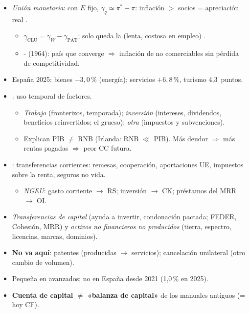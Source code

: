 \documentclass{article}
\begin{document}
\begin{columnas}
\begin{itemize}
\item \emph{Unión monetaria}: con $E$ fijo, $\gamma_q\simeq\pi^*-\pi$: inflación $>$ socios = apreciación real .
  \begin{itemize}
  \item $\gamma_{\mathrm{CLU}}=\gamma_W-\gamma_{\mathrm{PAT}}$; solo queda la  (lenta, costosa en empleo) .
  \item {}- (1964): país que converge $\Rightarrow$ inflación de no comerciables sin pérdida de competitividad.
  \end{itemize}
\item España 2025: bienes $-3{,}0$\,\% (energía); servicios $+6{,}8$\,\%, turismo 4,3~puntos.
\end{itemize}
\begin{itemize}
\item {}: uso temporal de factores.
  \begin{itemize}
  \item \emph{Trabajo} (fronterizos, temporada); \emph{inversión} (intereses, dividendos, beneficios reinvertidos; el grueso); \emph{otra} (impuestos y subvenciones).
  \item Explican PIB $\neq$ RNB (Irlanda: RNB $\ll$ PIB). Más deudor $\Rightarrow$ más rentas pagadas $\Rightarrow$ peor CC futura.
  \end{itemize}
\item {}: transferencias corrientes: remesas, cooperación, aportaciones UE, impuestos sobre la renta, seguros no vida.
  \begin{itemize}
  \item \emph{NGEU}: gasto corriente $\to$ RS; inversión $\to$ CK; préstamos del MRR $\to$ OI.
  \end{itemize}
\end{itemize}

\begin{itemize}
\item \emph{Transferencias de capital} (ayuda a invertir, condonación pactada; FEDER, Cohesión, MRR) y \emph{activos no financieros no producidos} (tierra, espectro, licencias, marcas, dominios).
\item \textbf{No va aquí}: patentes (producidas $\to$ servicios); cancelación unilateral (otro cambio de volumen).
\item Pequeña en avanzados; no en España desde 2021 (1,0\,\% en 2025).
\item \textbf{Cuenta de capital $\neq$ «balanza de capital»} de los manuales antiguos (= hoy CF).
\end{itemize}


\end{columnas}
\end{document}
